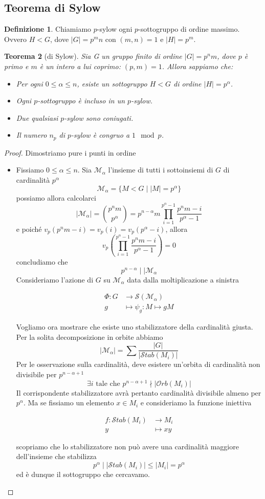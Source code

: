 \documentclass[a4paper]{article}
\newtheorem{theorem}{Teorema}[section]
\theoremstyle{remark}
\theoremstyle{definition}
\newtheorem{definition}[theorem]{Definizione}
\newcommand{\Orb}[1]{\mathcal{O}rb\left( #1 \right)}
\newcommand{\Stab}[1]{\mathcal{S}tab\left( #1 \right)}
\newcommand{\fun}[5]{
	\begin{align*}
	#1 \colon #2 &\to #3 \\
	#4 &\mapsto #5
	\end{align*}
}
\begin{document}
\subsection{Teorema di Sylow}
\begin{multicols}{2}
	\begin{definition}
		Chiamiamo $ p $-sylow ogni $ p $-sottogruppo di ordine massimo. Ovvero $ H < G $, dove $ |G| = p^mn $ con $ (m, n) = 1 $ e $ |H| = p^m $.
	\end{definition}
\begin{theorem}[di Sylow]\label{sylow}
	Sia G un gruppo finito di ordine $ |G| = p^nm  $, dove $ p $ è primo e $ m $ è un intero a lui coprimo: $ (p, m) = 1 $. Allora sappiamo che:
	\begin{itemize}
		\item[$ \exists $.] Per ogni $ 0 \leq \alpha \leq n $, esiste un sottogruppo $ H<G $ di ordine $|H| = p^\alpha $.
		\item[$ \subseteq $.] Ogni $ p $-sottogruppo è incluso in un $ p $-sylow.
		\item[$ \varphi_g $.] Due qualsiasi $ p $-sylow sono coniugati.
		\item[$ n_p $.] Il numero $ n_p $ di $ p $-sylow è congruo a $ 1 \mod{p}$.
	\end{itemize}
\end{theorem}
\begin{proof}
		Dimostriamo pure i punti in ordine
	\begin{itemize}

		\item[$ \exists $.] Fissiamo $ 0 \leq \alpha \leq n $. Sia $ \mathcal{M}_\alpha $ l'insieme di tutti i sottoinsiemi di $ G $ di cardinalità $ p^\alpha $ \[ \mathcal{M}_\alpha = \{ M < G \mid |M| = p^\alpha \} \] possiamo allora calcolarci
		\[ |\mathcal{M}_\alpha| = {p^nm \choose p^\alpha} = p^{n-\alpha}m \prod_{i = 1}^{p^\alpha - 1}\frac{p^nm-i}{p^\alpha -1} \]
		e poiché $ v_p({p^nm-i}) = v_p(i) =  v_p({p^\alpha -i}) $, allora
		$$  v_p\left(\prod_{i = 1}^{p^\alpha - 1}\frac{p^nm-i}{p^\alpha -1}\right) =  0  $$
		concludiamo che
		\[ p^{n-\alpha} \mid\mid \mathcal{M}_\alpha \]
		Consideriamo l'azione di $ G $ su $ \mathcal{M}_\alpha $ data dalla moltiplicazione a sinistra
		\fun{\Phi}{G}{\mathcal{S}(\mathcal{M}_\alpha)}{g}{\psi_g: M \mapsto gM}
		Vogliamo ora mostrare che esiste uno stabilizzatore della cardinalità giusta. Per la solita decomposizione in orbite abbiamo
		\[ |\mathcal{M}_\alpha| = \sum \frac{|G|}{|\Stab{M_i}|} \]
		Per le osservazione sulla cardinalità, deve esistere un'orbita di cardinalità non divisibile per $ p^{n-\alpha +1} $
		\[ \exists i \text{ tale che }  p^{n-\alpha +1}\nmid |\Orb{M_i}| \]
		 Il corrispondente stabilizzatore avrà pertanto cardinalità divisibile almeno per $ p^\alpha $.
		 Ma se fissiamo un elemento $ x \in M_i $ e consideriamo la funzione iniettiva
		 \fun{f}{\Stab{M_i}}{M_i}{y}{xy}
		 scopriamo che lo stabilizzatore non può avere una cardinalità maggiore dell'insieme che stabilizza
		 \[ p^\alpha \mid |\Stab{M_i}| \leq |M_i| = p^\alpha \]
		 ed è dunque il sottogruppo che cercavamo.
		

\end{itemize}
\end{proof}
\end{multicols}
\end{document}
